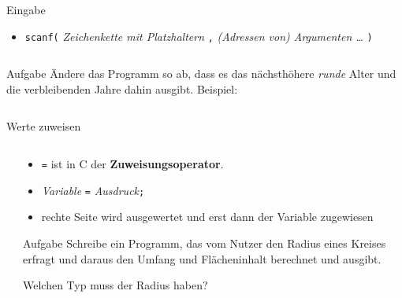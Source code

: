 \documentclass[
  aspectratio=1610,
]{beamer}
\begin{document}
\begin{frame}{Eingabe}
  \begin{itemize}
    \item \texttt{scanf(} %
      \textit{Zeichenkette mit Platzhaltern}
      \texttt{,}
      \textit{(Adressen von) Argumenten \ldots}
      \texttt{)} %

      \pause{}

      \inputminted{c}{eingabe.c}
  \end{itemize}

  \pause

  \begin{block}{Aufgabe}
    Ändere das Programm so ab, dass es das nächsthöhere \emph{runde} Alter und die
    verbleibenden Jahre dahin ausgibt. Beispiel:

    \inputminted{text}{eingabe_beispiel.txt}
  \end{block}

\end{frame}

\begin{frame}{Werte zuweisen}
  \begin{columns}[T]
    \begin{column}{0.40\textwidth}
      \inputminted{c}{zuweisung.c}
    \end{column}
    \begin{column}{0.60\textwidth}
      \begin{itemize}
        \item \texttt{=} ist in C der \textbf{Zuweisungsoperator}.
        \item \textit{Variable} \texttt{=} \textit{Ausdruck}\texttt{;}
        \item rechte Seite wird ausgewertet und erst dann der Variable zugewiesen
      \end{itemize}

      \pause

      \begin{block}{Aufgabe}
        Schreibe ein Programm, das vom Nutzer den Radius eines Kreises erfragt und daraus
        den Umfang und Flächeninhalt berechnet und ausgibt.

        Welchen Typ muss der Radius haben?
      \end{block}
    \end{column}
  \end{columns}
\end{frame}
\end{document}
